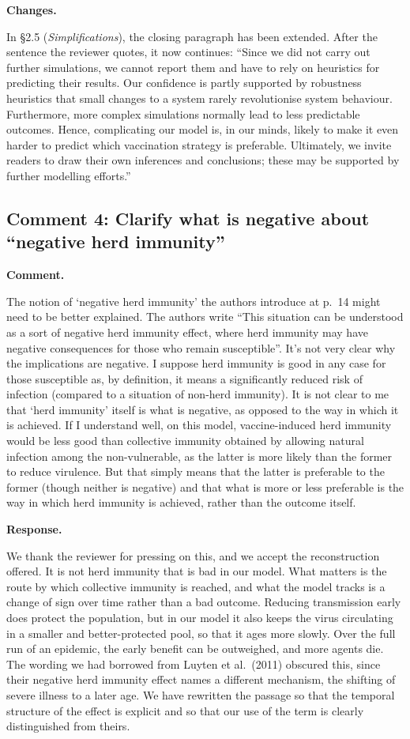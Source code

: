 \documentclass[a4paper,12pt]{article}
\newcommand{\reply}[1]{#1}
\newcommand{\rlabel}[1]{\par\medskip\noindent\textbf{#1}\par\nobreak}
\begin{document}
\rlabel{Changes.}
\reply{In \S2.5 (\emph{Simplifications}), the closing paragraph has been
extended. After the sentence the reviewer quotes, it now continues: ``Since we
did not carry out further simulations, we cannot report them and have to rely
on heuristics for predicting their results. Our confidence is partly supported
by robustness heuristics that small changes to a system rarely revolutionise
system behaviour. Furthermore, more complex simulations normally lead to less
predictable outcomes. Hence, complicating our model is, in our minds, likely to
make it even harder to predict which vaccination strategy is preferable.
Ultimately, we invite readers to draw their own inferences and conclusions;
these may be supported by further modelling efforts.''}

\subsection*{Comment 4: Clarify what is negative about ``negative herd immunity''}

\rlabel{Comment.}
The notion of `negative herd immunity' the authors introduce at p.\ 14 might need to be better explained. The authors write ``This situation can be understood as a sort of negative herd immunity effect, where herd immunity may have negative consequences for those who remain susceptible''. It's not very clear why the implications are negative. I suppose herd immunity is good in any case for those susceptible as, by definition, it means a significantly reduced risk of infection (compared to a situation of non-herd immunity). It is not clear to me that `herd immunity' itself is what is negative, as opposed to the way in which it is achieved. If I understand well, on this model, vaccine-induced herd immunity would be less good than collective immunity obtained by allowing natural infection among the non-vulnerable, as the latter is more likely than the former to reduce virulence. But that simply means that the latter is preferable to the former (though neither is negative) and that what is more or less preferable is the way in which herd immunity is achieved, rather than the outcome itself.

\rlabel{Response.}
\reply{We thank the reviewer for pressing on this, and we accept the
reconstruction offered. It is not herd immunity that is bad in our model. What
matters is the route by which collective immunity is reached, and what the
model tracks is a change of sign over time rather than a bad outcome. Reducing
transmission early does protect the population, but in our model it also keeps
the virus circulating in a smaller and better-protected pool, so that it ages
more slowly. Over the full run of an epidemic, the early benefit can be
outweighed, and more agents die. The wording we had borrowed from Luyten et
al.\ (2011) obscured this, since their negative herd immunity effect names a
different mechanism, the shifting of severe illness to a later age. We have
rewritten the passage so that the temporal structure of the effect is explicit
and so that our use of the term is clearly distinguished from theirs.}
\end{document}
